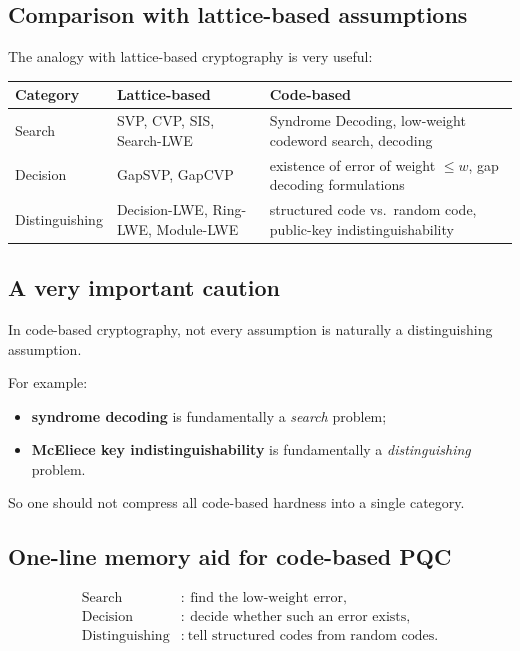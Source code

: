 \documentclass[11pt]{article}
\begin{document}
	\subsection{Comparison with lattice-based assumptions}
	
	The analogy with lattice-based cryptography is very useful:
	
	\begin{center}
		\renewcommand{\arraystretch}{1.35}
		\begin{tabular}{>{\raggedright\arraybackslash}p{3.3cm} >{\raggedright\arraybackslash}p{5cm} >{\raggedright\arraybackslash}p{5cm}}
			\toprule
			\textbf{Category} & \textbf{Lattice-based} & \textbf{Code-based} \\
			\midrule
			Search & SVP, CVP, SIS, Search-LWE & Syndrome Decoding, low-weight codeword search, decoding \\
			\midrule
			Decision & GapSVP, GapCVP & existence of error of weight $\le w$, gap decoding formulations \\
			\midrule
			Distinguishing & Decision-LWE, Ring-LWE, Module-LWE & structured code vs.\ random code, public-key indistinguishability \\
			\bottomrule
		\end{tabular}
	\end{center}
	
	\subsection{A very important caution}
	
	In code-based cryptography, not every assumption is naturally a distinguishing assumption.
	
	For example:
	\begin{itemize}
		\item \textbf{syndrome decoding} is fundamentally a \emph{search} problem;
		\item \textbf{McEliece key indistinguishability} is fundamentally a \emph{distinguishing} problem.
	\end{itemize}
	
	So one should not compress all code-based hardness into a single category.
	
	\subsection{One-line memory aid for code-based PQC}
	
	\[
	\boxed{
		\begin{aligned}
			\text{Search} &:\ \text{find the low-weight error},\\
			\text{Decision} &:\ \text{decide whether such an error exists},\\
			\text{Distinguishing} &:\ \text{tell structured codes from random codes.}
		\end{aligned}
	}
	\]
	
\end{document}
